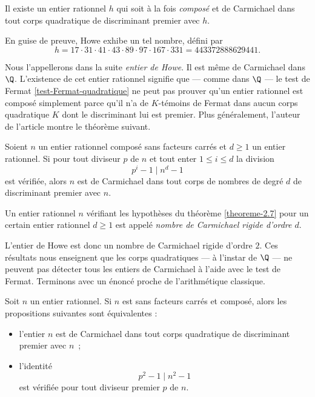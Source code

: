 \begin{theoreme}[Howe, 2000]
	Il existe un entier rationnel $h$ qui soit à la fois \emph{composé} et de Carmichael dans tout corps quadratique de discriminant premier avec $h$.
\end{theoreme}

En guise de preuve, Howe exhibe un tel nombre, défini par
	\begin{equation}\label{Howe}
		h = 17 \cdot 31 \cdot 41 \cdot 43 \cdot 89 \cdot 97 \cdot 167 \cdot 331 = 443372888629441.
	\end{equation}

Nous l'appellerons dans la suite \emph{entier de Howe}. Il est même de Carmichael dans $\Q$. L'existence de cet entier rationnel signifie que — comme dans $\Q$ — le test de Fermat \ref{test-Fermat-quadratique} ne peut pas prouver qu'un entier rationnel est composé simplement parce qu'il n'a de $K$-témoins de Fermat dans aucun corps quadratique $K$ dont le discriminant lui est premier. Plus généralement, l'auteur de l'article montre le théorème suivant.

\begin{theoreme}\label{theoreme-2.7}
	Soient $n$ un entier rationnel composé sans facteurs carrés et $d\geq 1$ un entier rationnel. Si pour tout diviseur $p$ de $n$ et tout enter $1\leq i \leq d$ la division $$p^i - 1\mid n^d - 1$$ est vérifiée, alors $n$ est de Carmichael dans tout corps de nombres de degré $d$ de discriminant premier avec $n$.
\end{theoreme}

\begin{definition}
	Un entier rationnel $n$ vérifiant les hypothèses du théorème \ref{theoreme-2.7} pour un certain entier rationnel $d\geq 1$ est appelé \emph{nombre de Carmichael rigide d'ordre $d$}.
\end{definition}

L'entier de Howe est donc un nombre de Carmichael rigide d'ordre $2$. Ces résultats nous enseignent que les corps quadratiques — à l'instar de $\Q$ — ne peuvent pas détecter tous les entiers de Carmichael à l'aide avec le test de Fermat. Terminons avec un énoncé proche de l'arithmétique classique.

\begin{corollaire}
	Soit $n$ un entier rationnel. Si $n$ est sans facteurs carrés et composé, alors les propositions suivantes sont équivalentes :
	\begin{itemize}
		\item l'entier $n$ est de Carmichael dans tout corps quadratique de discriminant premier avec $n$~;
		\item l'identité \[p^2 - 1 \mid n^2 - 1\] est vérifiée pour tout diviseur premier $p$ de $n$.
	\end{itemize}
\end{corollaire}

